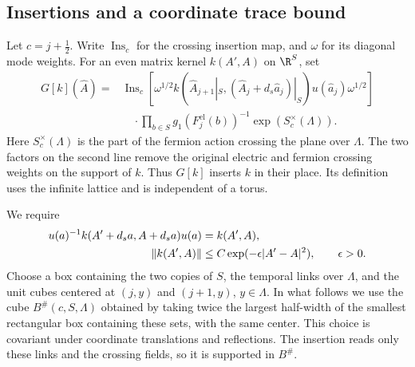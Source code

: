 \subsection{Insertions and a coordinate trace bound}\label{subsec:diag-insertions}

Let $c=j+\tfrac12$. Write $\operatorname{Ins}_c$ for the crossing
insertion map, and $\omega$ for its diagonal mode weights. For an
even matrix kernel $k(A',A)$ on $\R^S$, set
\begin{equation}\label{eq:diag-kernel-insertion}
 \begin{split}
 G[k](\widehat A)={}&\operatorname{Ins}_c\!\left[
   \omega^{1/2}k(\widehat A_{j+1}|_S,
           (\widehat A_j+d_s\widehat a_j)|_S)
             u(\widehat a_j)\omega^{1/2}\right]\\
 &\quad\cdot\prod_{b\in S}g_1(F_j^{\mathrm{el}}(b))^{-1}
                      \exp(S_c^\times(\Lambda)).
 \end{split}
\end{equation}
Here $S_c^\times(\Lambda)$ is the part of the fermion action crossing
the plane over $\Lambda$. The two factors on the second line remove
the original electric and fermion crossing weights on the support
of $k$. Thus $G[k]$ inserts $k$ in their place. Its definition uses
the infinite lattice and is independent of a torus.

We require
\begin{align}\label{eq:diag-kernel-conditions}
 u(a)^{-1}k(A'+d_sa,A+d_sa)u(a)&=k(A',A),\notag\\
 \|k(A',A)\|&\le C\exp(-\epsilon|A'-A|^2),\qquad\epsilon>0.
\end{align}
Choose a box containing the two copies of $S$, the temporal links
over $\Lambda$, and the unit cubes centered at $(j,y)$ and $(j+1,y)$,
$y\in\Lambda$. In what follows we use the cube $B^\#(c,S,\Lambda)$
obtained by taking twice the largest half-width of the smallest
rectangular box containing these sets, with the same center. This
choice is covariant under coordinate translations and reflections.
The insertion reads only these links and the crossing fields, so
it is supported in $B^\#$.

